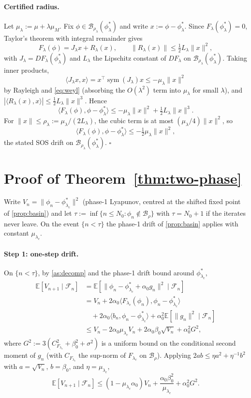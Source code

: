 \documentclass{article}
\theoremstyle{plain}
\theoremstyle{definition}
\theoremstyle{remark}
\newcommand{\E}{\mathbb{E}}
\newcommand{\B}{\mathcal{B}}
\newcommand{\F}{\mathcal{F}}
\begin{document}
\paragraph{Certified radius.}
Let $\mu_\lambda:=\mu+\lambda\mu_M$. Fix $\phi\in\B_{\rho_\lambda}(\phi^\ast_\lambda)$ and write $x:=\phi-\phi^\ast_\lambda$. Since $F_\lambda(\phi^\ast_\lambda)=0$, Taylor's theorem with integral remainder gives
\[
F_\lambda(\phi)=J_\lambda x+R_\lambda(x),\qquad \|R_\lambda(x)\|\le\tfrac{1}{2}L_\lambda\|x\|^2,
\]
with $J_\lambda=DF_\lambda(\phi^\ast_\lambda)$ and $L_\lambda$ the Lipschitz constant of $DF_\lambda$ on $\B_{\rho_\lambda}(\phi^\ast_\lambda)$. Taking inner products,
\[
\langle J_\lambda x,x\rangle=x^\top\operatorname{sym}(J_\lambda)x\le -\mu_\lambda\|x\|^2
\]
by Rayleigh and \eqref{eq:weyl} (absorbing the $O(\lambda^2)$ term into $\mu_\lambda$ for small $\lambda$), and $|\langle R_\lambda(x),x\rangle|\le\tfrac{1}{2}L_\lambda\|x\|^3$. Hence
\[
\langle F_\lambda(\phi),\phi-\phi^\ast_\lambda\rangle\le-\mu_\lambda\|x\|^2+\tfrac{1}{2}L_\lambda\|x\|^3.
\]
For $\|x\|\le\rho_\lambda:=\mu_\lambda/(2L_\lambda)$, the cubic term is at most $(\mu_\lambda/4)\|x\|^2$, so
\[
\langle F_\lambda(\phi),\phi-\phi^\ast_\lambda\rangle\le-\tfrac{1}{2}\mu_\lambda\|x\|^2,
\]
the stated SOS drift on $\B_{\rho_\lambda}(\phi^\ast_\lambda)$. $\square$

\section{Proof of Theorem~\ref{thm:two-phase}}\label{app:thm-twophase}

Write $V_n=\|\phi_n-\phi^\ast_{\lambda_c}\|^2$ (phase-1 Lyapunov, centred at the shifted fixed point of \cref{prop:basin}) and let $\tau:=\inf\{n\le N_0:\phi_n\notin\B_\rho\}$ with $\tau=N_0+1$ if the iterates never leave. On the event $\{n<\tau\}$ the phase-1 drift of \cref{prop:basin} applies with constant $\mu_{\lambda_c}$.

\paragraph{Step 1: one-step drift.}
On $\{n<\tau\}$, by \cref{as:decomp} and the phase-1 drift bound around $\phi^\ast_{\lambda_c}$,
\[
\begin{aligned}
\E[V_{n+1}\mid\F_n]
&=\E\!\left[\|\phi_n-\phi^\ast_{\lambda_c}+\alpha_0 g_n\|^2\mid\F_n\right]\\
&=V_n+2\alpha_0\langle F_{\lambda_c}(\phi_n),\phi_n-\phi^\ast_{\lambda_c}\rangle\\
&\quad+2\alpha_0\langle b_n,\phi_n-\phi^\ast_{\lambda_c}\rangle+\alpha_0^2\E[\|g_n\|^2\mid\F_n]\\
&\le V_n-2\alpha_0\mu_{\lambda_c}V_n
+2\alpha_0\beta_0\sqrt{V_n}+\alpha_0^2 G^2,
\end{aligned}
\]
where $G^2:=3(C_{F_{\lambda_c}}^2+\beta_0^2+\sigma^2)$ is a uniform bound on the conditional second moment of $g_n$ (with $C_{F_{\lambda_c}}$ the sup-norm of $F_{\lambda_c}$ on $\B_\rho$). Applying $2a b\le \eta a^2+\eta^{-1}b^2$ with $a=\sqrt{V_n}$, $b=\beta_0$, and $\eta=\mu_{\lambda_c}$,
\[
\E[V_{n+1}\mid\F_n]\le (1-\mu_{\lambda_c}\alpha_0)V_n
+\frac{\alpha_0\beta_0^2}{\mu_{\lambda_c}}+\alpha_0^2 G^2.
\]
\end{document}
